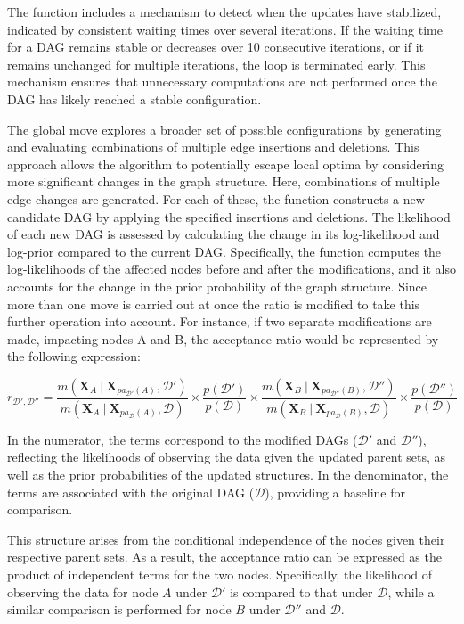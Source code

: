 \documentclass{report}
\begin{document}
The function includes a mechanism to detect when the updates have stabilized, indicated by consistent waiting times over several iterations. If the waiting time for a DAG remains stable or decreases over 10 consecutive iterations, or if it remains unchanged for multiple iterations, the loop is terminated early. This mechanism ensures that unnecessary computations are not performed once the DAG has likely reached a stable configuration. 

The global move explores a broader set of possible configurations by generating and evaluating combinations of multiple edge insertions and deletions. This approach allows the algorithm to potentially escape local optima by considering more significant changes in the graph structure.
Here, combinations of multiple edge changes are generated. 
For each of these, the function constructs a new candidate DAG by applying the specified insertions and deletions. The likelihood of each new DAG is assessed by calculating the change in its log-likelihood and log-prior compared to the current DAG. Specifically, the function computes the log-likelihoods of the affected nodes before and after the modifications, and it also accounts for the change in the prior probability of the graph structure. 
Since more than one move is carried out at once the ratio is modified to take this further operation into account. For instance, if two separate modifications are made, impacting nodes A and B, the acceptance ratio would be represented by the following expression:

$$
r_{\mathcal{D'}, \mathcal{D''}}= \frac{m(\mathbf{X}_A \ | \  \mathbf{X}_{pa_{\mathcal{D}'}(A)}, \mathcal{D}')}{m(\mathbf{X}_A \  | \  \mathbf{X}_{pa_{\mathcal{D}}(A)}, \mathcal{D})} \times \frac{p(\mathcal{D}')}{p(\mathcal{D})} \times \frac{m(\mathbf{X}_B \ | \  \mathbf{X}_{pa_{\mathcal{D}''}(B)}, \mathcal{D}'')}{m(\mathbf{X}_B \  | \  \mathbf{X}_{pa_{\mathcal{D}}(B)}, \mathcal{D})} \times \frac{p(\mathcal{D}'')}{p(\mathcal{D})}
$$

In the numerator, the terms correspond to the modified DAGs ($\mathcal{D}'$ and $\mathcal{D}''$), reflecting the likelihoods of observing the data given the updated parent sets, as well as the prior probabilities of the updated structures. In the denominator, the terms are associated with the original DAG ($\mathcal{D}$), providing a baseline for comparison.

This structure arises from the conditional independence of the nodes given their respective parent sets. As a result, the acceptance ratio can be expressed as the product of independent terms for the two nodes. Specifically, the likelihood of observing the data for node $A$ under $\mathcal{D}'$ is compared to that under $\mathcal{D}$, while a similar comparison is performed for node $B$ under $\mathcal{D}''$ and $\mathcal{D}$.
\end{document}
